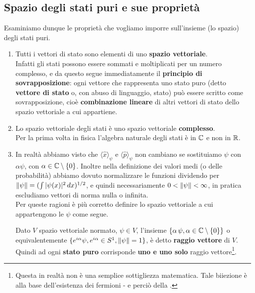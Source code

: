 \documentclass[FisicaTeorica.tex]{subfiles}
\begin{document}
\subsection{Spazio degli stati puri e sue proprietà}
Esaminiamo dunque le proprietà che vogliamo imporre sull'insieme (lo spazio) degli stati puri.
\begin{enumerate}
    \item Tutti i vettori di stato sono elementi di uno \textbf{spazio vettoriale}. \\
    Infatti gli stati possono essere sommati e moltiplicati per un numero complesso, e da questo segue immediatamente il \textbf{principio di sovrapposizione}: ogni vettore che rappresenta uno stato puro (detto \textbf{vettore di stato} o, con abuso di linguaggio, stato) può essere scritto come sovrapposizione, cioè \textbf{combinazione lineare} di altri vettori di stato dello spazio vettoriale a cui appartiene.
    \item Lo spazio vettoriale degli stati è uno spazio vettoriale \textbf{complesso}. \\
    Per la prima volta in fisica l'algebra naturale degli stati è in $\mathbb{C}$ e non in $\mathbb{R}$.
    \item In realtà abbiamo visto che $\langle \hat{x}\rangle_\psi$ e $\langle \hat{p}\rangle_\psi$ non cambiano se sostituiamo $\psi$ con $\alpha \psi$, con $\alpha \in \mathbb{C}\setminus \{0\}$. Inoltre nella definizione dei valori medi (o delle probabilità) abbiamo dovuto normalizzare le funzioni dividendo per $\left\lVert\psi\right\rVert = (\int |\psi(x)|^2\, dx)^{1/2}$, e quindi necessariamente $0<\left\lVert\psi\right\rVert<\infty$, in pratica escludiamo vettori di norma nulla o infinita.\\
    Per queste ragioni è più corretto definire lo spazio vettoriale a cui appartengono le $\psi$ come segue. \vspace{-0.3em}
    \begin{dfn}
    Dato $V$ spazio vettoriale normato, $\psi \in V$, l'insieme $\{\alpha\,\psi, \alpha \in \mathbb{C}\setminus \{0\}\}$ o equivalentemente $\{e^{i\alpha}\psi, e^{i\alpha} \in S^1, \left\lVert\psi\right\rVert = 1 \}$, è detto \textbf{raggio vettore} di $V$. Quindi ad ogni \textbf{stato puro} corrisponde \textbf{uno e uno solo} raggio vettore\footnote{Questa in realtà non è una semplice sottigliezza matematica. Tale biiezione  è alla base dell'esistenza dei fermioni - e perciò della .}.

\end{dfn}
\end{enumerate}
\end{document}

